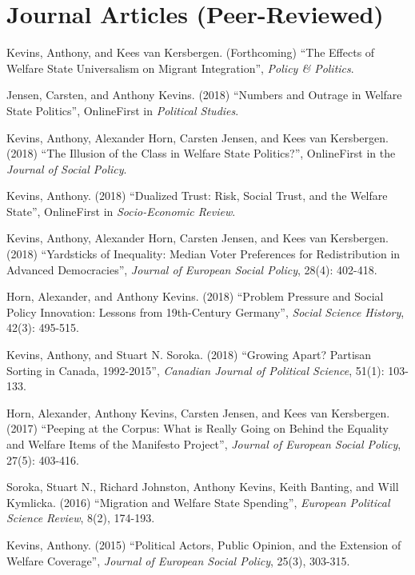 \documentclass[letterpaper,fontsize=10pt]{scrartcl}
\newenvironment{modenumerate}
  {\enumerate\setupmodenumerate}
  {\endenumerate}
\newif\ifmoditem
\newcommand{\setupmodenumerate}{%
  \global\moditemfalse
  \let\origmakelabel\makelabel
  \def\moditem##1{\global\moditemtrue\def\mesymbol{##1}\item}%
  \def\makelabel##1{%
    \origmakelabel{##1\ifmoditem\rlap{\mesymbol}\fi\enspace}%
    \global\moditemfalse}%
}
\begin{document}
\section{Journal Articles (Peer-Reviewed)}
	\vspace{-1.5em}
	\begin{modenumerate}
 			\moditem{*}	Kevins, Anthony, and Kees van Kersbergen. (Forthcoming) ``The Effects of Welfare State Universalism on Migrant Integration'', \textit{Policy \& Politics}.
			\moditem{*}	Jensen, Carsten, and Anthony Kevins. (2018) ``Numbers and Outrage in Welfare State Politics'', OnlineFirst in \textit{Political Studies}.
			\item	Kevins, Anthony, Alexander Horn, Carsten Jensen, and Kees van Kersbergen. (2018) ``The Illusion of the Class in Welfare State Politics?'', OnlineFirst in the \textit{Journal of Social Policy}.
			\moditem{*} Kevins, Anthony. (2018) ``Dualized Trust: Risk, Social Trust, and the Welfare State'', OnlineFirst in \textit{Socio-Economic Review}.
			\moditem{*}	Kevins, Anthony, Alexander Horn, Carsten Jensen, and Kees van Kersbergen. (2018) ``Yardsticks of Inequality: Median Voter Preferences for Redistribution in Advanced Democracies'', \textit{Journal of European Social Policy}, 28(4): 402-418.
			\item Horn, Alexander, and Anthony Kevins. (2018) ``Problem Pressure and Social Policy Innovation: Lessons from 19th-Century Germany'', \textit{Social Science History}, 42(3): 495-515.
      \moditem{*} Kevins, Anthony, and Stuart N. Soroka. (2018) ``Growing Apart? Partisan Sorting in Canada, 1992-2015'', \textit{Canadian Journal of Political Science}, 51(1): 103-133.
			\item Horn, Alexander, Anthony Kevins, Carsten Jensen, and Kees van Kersbergen. (2017) ``Peeping at the Corpus: What is Really Going on Behind the Equality and Welfare Items of the Manifesto Project'', \textit{Journal of European Social Policy}, 27(5): 403-416.
			\item Soroka, Stuart N., Richard Johnston, Anthony Kevins, Keith Banting, and Will Kymlicka. (2016) ``Migration and Welfare State Spending'', \textit{European Political Science Review}, 8(2), 174-193.
			\item Kevins, Anthony. (2015) ``Political Actors, Public Opinion, and the Extension of Welfare Coverage'', \textit{Journal of European Social Policy}, 25(3), 303-315.
	\end{modenumerate}
\end{document}
